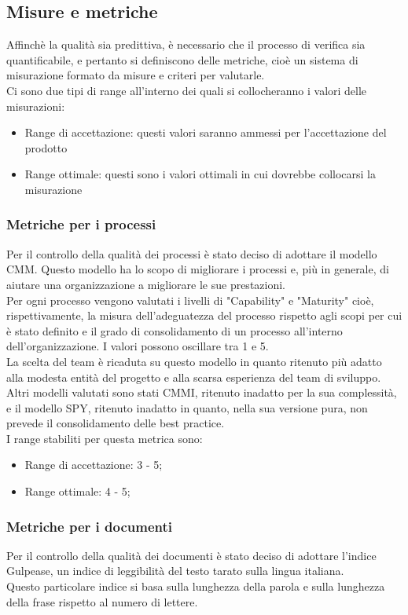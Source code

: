 	\subsection{Misure e metriche}
	Affinchè la qualità sia predittiva, è necessario che il processo di verifica sia quantificabile, e pertanto si definiscono delle metriche, cioè un sistema di misurazione formato da misure e criteri per valutarle.\\
	Ci sono due tipi di range all'interno dei quali si collocheranno i valori delle misurazioni:
	\begin{itemize}
		\item Range di accettazione: questi valori saranno ammessi per l'accettazione del prodotto
		\item Range ottimale: questi sono i valori ottimali in cui dovrebbe collocarsi la misurazione
	\end{itemize}
	\subsubsection{Metriche per i processi}
		Per il controllo della qualità dei processi è stato deciso di adottare il modello CMM. Questo modello ha lo scopo di migliorare i processi e, più in generale, di aiutare una organizzazione a migliorare le sue prestazioni.\\
		Per ogni processo vengono valutati i livelli di "Capability" e "Maturity" cioè, rispettivamente, la misura dell'adeguatezza del processo  rispetto agli scopi per cui è stato definito e il grado di consolidamento di un processo all'interno dell'organizzazione. I valori possono oscillare tra 1 e 5.\\
		La scelta del team è ricaduta su questo modello in quanto ritenuto più adatto alla modesta entità del progetto e alla scarsa esperienza del team di sviluppo. Altri modelli valutati sono stati CMMI, ritenuto inadatto per la sua complessità, e il modello SPY, ritenuto inadatto in quanto, nella sua versione pura, non prevede il consolidamento delle best practice.\\
		I range stabiliti per questa metrica sono:
		\begin{itemize}
			\item Range di accettazione: 3 - 5;
			\item Range ottimale: 4 - 5;
		\end{itemize}	
	\subsubsection{Metriche per i documenti}
		Per il controllo della qualità dei documenti è stato deciso di adottare l'indice Gulpease, un indice di leggibilità del testo tarato sulla lingua italiana.\\
		Questo particolare indice si basa sulla lunghezza della parola e sulla lunghezza della frase rispetto al numero di lettere.\\
		
